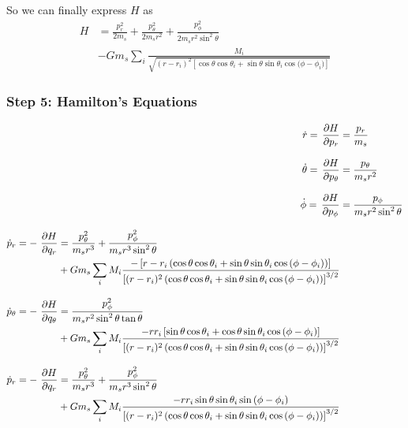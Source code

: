 So we can finally express \(H\) as
\begin{equation}
    \begin{aligned}
        H &= \frac{p_r^2}{2 m_s} + \frac{p_\theta^2}{2 m_s r^2} + \frac{p_\phi^2}{2 m_s r^2 \sin^2{\theta}} \\
        &- G m_s \sum\limits_{i} \frac{M_i}{\sqrt{(r - r_i)^2\left[\cos{\theta}\cos{\theta_i}+\sin{\theta}\sin{\theta_i}\cos{(\phi - \phi_i})\right]}}
    \end{aligned}
\end{equation}

\subsubsection{Step 5: Hamilton's Equations}
\begin{align}
    \dot{r} = \operatorname{}\frac{\partial H}{\partial p_r} &= \frac{p_r}{m_s} \label{eq:rdot} \\[0.3cm]
    \dot{\theta} = \operatorname{}\frac{\partial H}{\partial p_\theta} &= \frac{p_\theta}{m_s r^2} \label{eq:thetadot} \\[0.3cm]
    \dot{\phi} = \operatorname{}\frac{\partial H}{\partial p_\phi} &= \frac{p_\phi}{m_s r^2 \sin^2{\theta}} \label{eq:phidot}  \\[0.3cm]
    \begin{split}
        \dot{p}_r = -\operatorname{}\frac{\partial H}{\partial q_r} &= \frac{p_\theta^2}{m_s r^3} + \frac{p_\phi^2}{m_s r^3 \sin^2{\theta} } \\
        &+ G m_s \sum\limits_{i} M_i \frac{-\left[r - r_i \left(\cos{\theta}\cos{\theta_i} + \sin{\theta}\sin{\theta_i}\cos{(\phi - \phi_i)}\right) \right]}{\left[(r - r_i)^2 \left(\cos{\theta}\cos{\theta_i} + \sin{\theta}\sin{\theta_i}\cos{(\phi - \phi_i)} \right) \right]^{3/2}} \label{eq:prdot}
    \end{split} \\[0.3cm]
    \begin{split}
        \dot{p}_\theta = -\operatorname{}\frac{\partial H}{\partial q_\theta} &= \frac{p_\phi^2}{m_s r^2 \sin^2{\theta} \tan{\theta}} \\
        &+ G m_s \sum\limits_{i} M_i \frac{- r r_i \left[\sin{\theta}\cos{\theta_i} + \cos{\theta}\sin{\theta_i}\cos{(\phi - \phi_i)} \right]}{\left[(r - r_i)^2 \left(\cos{\theta}\cos{\theta_i} + \sin{\theta}\sin{\theta_i}\cos{(\phi - \phi_i)} \right) \right]^{3/2}} \label{eq:pthetadot}
    \end{split} \\[0.3cm]
    \begin{split}
        \dot{p}_r = -\operatorname{}\frac{\partial H}{\partial q_r} &= \frac{p_\theta^2}{m_s r^3} + \frac{p_\phi^2}{m_s r^3 \sin^2{\theta} } \\
        &+ G m_s \sum\limits_{i} M_i \frac{-r r_i \sin{\theta}\sin{\theta_i}\sin{(\phi - \phi_i)}}{\left[(r - r_i)^2 \left(\cos{\theta}\cos{\theta_i} + \sin{\theta}\sin{\theta_i}\cos{(\phi - \phi_i)} \right) \right]^{3/2}} \label{eq:pphidot}
    \end{split}
\end{align}

